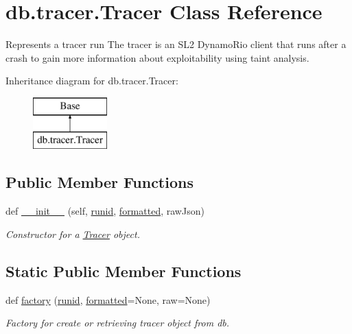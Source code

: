 \hypertarget{classdb_1_1tracer_1_1_tracer}{}\section{db.\+tracer.\+Tracer Class Reference}
\label{classdb_1_1tracer_1_1_tracer}


Represents a tracer run The tracer is an S\+L2 Dynamo\+Rio client that runs after a crash to gain more information about exploitability using taint analysis.  


Inheritance diagram for db.\+tracer.\+Tracer\+:\begin{figure}[H]
\begin{center}
\leavevmode
\includegraphics[height=2.000000cm]{df/d0c/classdb_1_1tracer_1_1_tracer}
\end{center}
\end{figure}
\subsection*{Public Member Functions}
\begin{DoxyCompactItemize}
\item 
def \mbox{\hyperlink{classdb_1_1tracer_1_1_tracer_ae6ad30159b715a1a432885f34316faa5}{\+\_\+\+\_\+init\+\_\+\+\_\+}} (self, \mbox{\hyperlink{classdb_1_1tracer_1_1_tracer_ad3aa7209ddeb56fbe3fc6b45c3b5fe79}{runid}}, \mbox{\hyperlink{classdb_1_1tracer_1_1_tracer_ae6dc96b9d95be36d52dde3203cadd45a}{formatted}}, raw\+Json)
\begin{DoxyCompactList}\small\item\em Constructor for a \mbox{\hyperlink{classdb_1_1tracer_1_1_tracer}{Tracer}} object. \end{DoxyCompactList}\end{DoxyCompactItemize}
\subsection*{Static Public Member Functions}
\begin{DoxyCompactItemize}
\item 
def \mbox{\hyperlink{classdb_1_1tracer_1_1_tracer_a35412bf2e61800e58d855199f6957f41}{factory}} (\mbox{\hyperlink{classdb_1_1tracer_1_1_tracer_ad3aa7209ddeb56fbe3fc6b45c3b5fe79}{runid}}, \mbox{\hyperlink{classdb_1_1tracer_1_1_tracer_ae6dc96b9d95be36d52dde3203cadd45a}{formatted}}=None, raw=None)
\begin{DoxyCompactList}\small\item\em Factory for create or retrieving tracer object from db. \end{DoxyCompactList}\end{DoxyCompactItemize}
